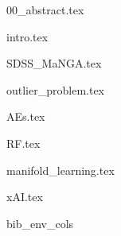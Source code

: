 \documentclass[letterpaper, 12pt]{article}
\begin{document}
  {00_abstract.tex}

  {intro.tex}

  {SDSS_MaNGA.tex}

  {outlier_problem.tex}

  {AEs.tex}

  {RF.tex}

  {manifold_learning.tex}

  {xAI.tex}

  \clearpage
  \newpage

  {bib_env_cols}

  \scriptsize
  
\end{document}
